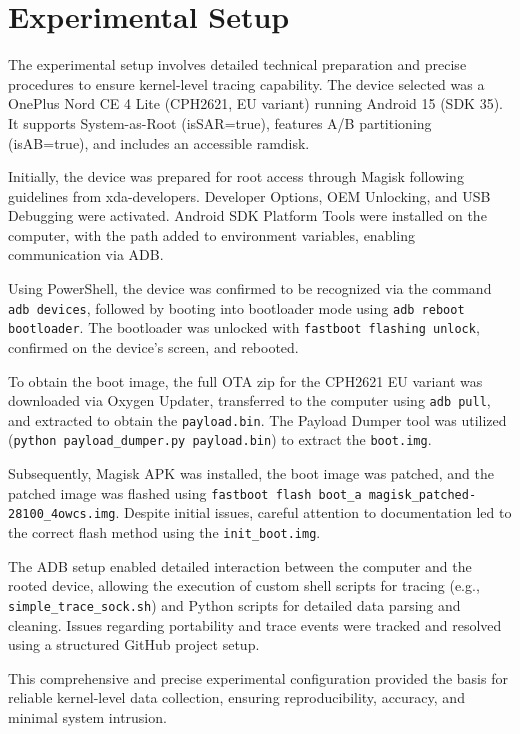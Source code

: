 \documentclass[a4paper,12pt]{report}
\begin{document}
\section{Experimental Setup}

The experimental setup involves detailed technical preparation and precise procedures to ensure kernel-level tracing capability. The device selected was a OnePlus Nord CE 4 Lite (CPH2621, EU variant) running Android 15 (SDK 35). It supports System-as-Root (isSAR=true), features A/B partitioning (isAB=true), and includes an accessible ramdisk.

Initially, the device was prepared for root access through Magisk following guidelines from xda-developers. Developer Options, OEM Unlocking, and USB Debugging were activated. Android SDK Platform Tools were installed on the computer, with the path added to environment variables, enabling communication via ADB.

Using PowerShell, the device was confirmed to be recognized via the command \texttt{adb devices}, followed by booting into bootloader mode using \texttt{adb reboot bootloader}. The bootloader was unlocked with \texttt{fastboot flashing unlock}, confirmed on the device's screen, and rebooted.

To obtain the boot image, the full OTA zip for the CPH2621 EU variant was downloaded via Oxygen Updater, transferred to the computer using \texttt{adb pull}, and extracted to obtain the \texttt{payload.bin}. The Payload Dumper tool was utilized (\texttt{python payload\_dumper.py payload.bin}) to extract the \texttt{boot.img}.

Subsequently, Magisk APK was installed, the boot image was patched, and the patched image was flashed using \texttt{fastboot flash boot\_a magisk\_patched-28100\_4owcs.img}. Despite initial issues, careful attention to documentation led to the correct flash method using the \texttt{init\_boot.img}.

The ADB setup enabled detailed interaction between the computer and the rooted device, allowing the execution of custom shell scripts for tracing (e.g., \texttt{simple\_trace\_sock.sh}) and Python scripts for detailed data parsing and cleaning. Issues regarding portability and trace events were tracked and resolved using a structured GitHub project setup.

This comprehensive and precise experimental configuration provided the basis for reliable kernel-level data collection, ensuring reproducibility, accuracy, and minimal system intrusion.
\end{document}
